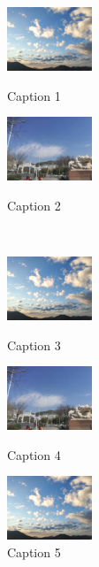 \documentclass{ctexart}
\begin{document}
\begin{figure}[htbp]
	\centering 
	\begin{minipage}[t]{0.33\textwidth}
		\centering
		 \includegraphics[width=1in]{pic1} 
		 \caption{Caption 1}
	\end{minipage}%
	\hspace{0.03\textwidth}	%
	\begin{minipage}[t]{0.33\textwidth}
		\centering
		\includegraphics[width=1in]{pic2} 
		\caption{Caption 2}
	\end{minipage}		\\[20pt]		%
	\begin{minipage}[t]{0.3\textwidth}
		\centering
		\includegraphics[width=1in]{pic1} 
		\caption{Caption 3}
	\end{minipage}%
\hspace{0.04\linewidth}%
\begin{minipage}[t]{0.3\textwidth}
	\centering
	\includegraphics[width=1in]{pic2} 
	\caption{Caption 4}
\end{minipage}%
\hspace{0.04\linewidth}%
\begin{minipage}[t]{0.3\textwidth}
	\centering
	\includegraphics[width=1in]{pic1} 
	\caption{Caption 5}
\end{minipage}
\end{figure}

	
\end{document}
